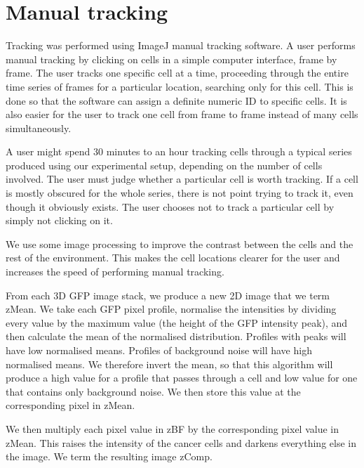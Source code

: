 \section{Manual tracking}

Tracking was performed using ImageJ manual tracking software. A user performs manual tracking by clicking on cells in a simple computer interface, frame by frame. The user tracks one specific cell at a time, proceeding through the entire time series of frames for a particular location, searching only for this cell. This is done so that the software can assign a definite numeric ID to specific cells. It is also easier for the user to track one cell from frame to frame instead of many cells simultaneously.

A user might spend 30 minutes to an hour tracking cells through a typical series produced using our experimental setup, depending on the number of cells involved. The user must judge whether a particular cell is worth tracking. If a cell is mostly obscured for the whole series, there is not point trying to track it, even though it obviously exists. The user chooses not to track a particular cell by simply not clicking on it.

We use some image processing to improve the contrast between the cells and the rest of the environment. This makes the cell locations clearer for the user and increases the speed of performing manual tracking.

From each 3D GFP image stack, we produce a new 2D image that we term zMean. We take each GFP pixel profile, normalise the intensities by dividing every value by the maximum value (the height of the GFP intensity peak), and then calculate the mean of the normalised distribution. Profiles with peaks will have low normalised means. Profiles of background noise will have high normalised means. We therefore invert the mean, so that this algorithm will produce a high value for a profile that passes through a cell and low value for one that contains only background noise. We then store this value at the corresponding pixel in zMean.


We then multiply each pixel value in zBF by the corresponding pixel value in zMean. This raises the intensity of the cancer cells and darkens everything else in the image. We term the resulting image zComp.

